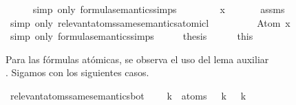 \begin{isabellebody}
\ \ \ \ \isamarkupfalse%
\ {\isacharparenleft}simp\ only{\isacharcolon}\ formula{\isacharunderscore}semantics{\isachardot}simps{\isacharparenleft}{}{\isacharparenright}{\isacharparenright}\isanewline
\ \ \isamarkupfalse%
\ \isamarkupfalse%
\ {\isachardoublequoteopen}{\isasymdots}\ {\isacharequal}\ {\isasymA}\ x{\isachardoublequoteclose}\isanewline
\ \ \ \ \isamarkupfalse%
\ \ assms{\isacharparenleft}{}{\isacharparenright}\isanewline
\ \ \ \ \isamarkupfalse%
\ {\isacharparenleft}simp\ only{\isacharcolon}\ relevant{\isacharunderscore}atoms{\isacharunderscore}same{\isacharunderscore}semantics{\isacharunderscore}atomic{\isacharunderscore}l{}{\isacharparenright}\isanewline
\ \ \isamarkupfalse%
\ \isamarkupfalse%
\ {\isachardoublequoteopen}{\isasymdots}\ {\isacharequal}\ {\isasymA}\ {\isasymTurnstile}\ Atom\ x{\isachardoublequoteclose}\isanewline
\ \ \ \ \isamarkupfalse%
\ {\isacharparenleft}simp\ only{\isacharcolon}\ formula{\isacharunderscore}semantics{\isachardot}simps{\isacharparenleft}{}{\isacharparenright}{\isacharparenright}\isanewline
\ \ \isamarkupfalse%
\ \isamarkupfalse%
\ {\isacharquery}thesis\isanewline
\ \ \ \ \isamarkupfalse%
\ this\isanewline
{}\isamarkupfalse%
%
\endisatagproof
{\isafoldproof}%
%
\isadelimproof
%
\endisadelimproof
%
\begin{isamarkuptext}%
Para las fórmulas atómicas, se observa el uso del lema 
  auxiliar\\ . Sigamos con los
  siguientes casos.%
\end{isamarkuptext}\isamarkuptrue%
\isamarkupfalse%
\ relevant{\isacharunderscore}atoms{\isacharunderscore}same{\isacharunderscore}semantics{\isacharunderscore}bot{\isacharcolon}\ \isanewline
\ \ \ {\isachardoublequoteopen}{\isasymforall}k\ {\isasymin}\ atoms\ {\isasymbottom}{\isachardot}\ {\isasymA}\ k\ {\isacharequal}\ {\isasymA}\ k{\isachardoublequoteclose}\isanewline
\ \ \ {\isachardoublequoteopen}{\isasymA}\ {\isasymTurnstile}\ {\isasymbottom}\ {\isasymlongleftrightarrow}\ {\isasymA}\ {\isasymTurnstile}\ {\isasymbottom}{\isachardoublequoteclose}\isanewline

\end{isabellebody}
